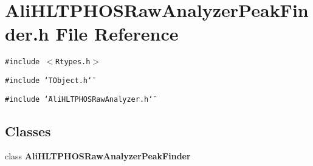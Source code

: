 \section{Ali\-HLTPHOSRaw\-Analyzer\-Peak\-Finder.h File Reference}
\label{AliHLTPHOSRawAnalyzerPeakFinder_8h}
{\tt \#include $<$Rtypes.h$>$}\par
{\tt \#include \char`\"{}TObject.h\char`\"{}}\par
{\tt \#include \char`\"{}Ali\-HLTPHOSRaw\-Analyzer.h\char`\"{}}\par
\subsection*{Classes}
\begin{CompactItemize}
\item 
class {\bf Ali\-HLTPHOSRaw\-Analyzer\-Peak\-Finder}
\end{CompactItemize}
